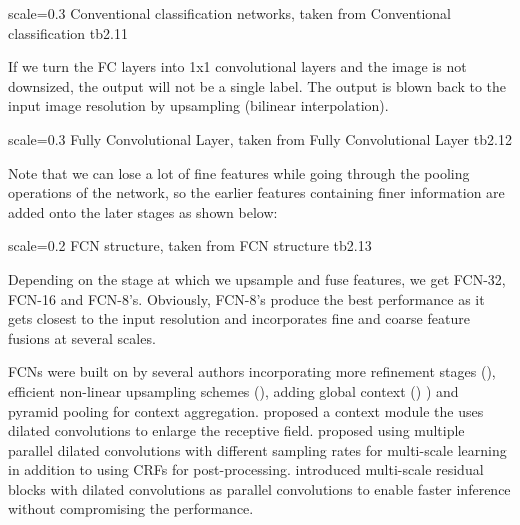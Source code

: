 {scale=0.3}%
{Conventional classification networks, taken from \cite{long2015}}%
{Conventional classification}%
{tb2.11} %

If we turn the FC layers into 1x1 convolutional layers and the image is not downsized, the output will not be a single label. The output is blown back to the input image resolution by upsampling (bilinear interpolation). 

{scale=0.3}%
{Fully Convolutional Layer, taken from \cite{long2015}}%
{Fully Convolutional Layer}%
{tb2.12}

Note that we can lose a lot of fine features while going through the pooling operations of the network, so the earlier features containing finer information are added onto the later stages as shown below:

{scale=0.2}%
{FCN structure, taken from \cite{long2015}}%
{FCN structure}%
{tb2.13}

Depending on the stage at which we upsample and fuse features, we get FCN-32, FCN-16 and FCN-8's. Obviously, FCN-8's produce the best performance as it gets closest to the input resolution and incorporates fine and coarse feature fusions at several scales. 

FCNs were built on by several authors incorporating more refinement stages (\cite{badrinarayanan2016}), efficient non-linear upsampling  schemes  (\cite{liu2015}),  adding  global  context () \cite{zhao2017})  and pyramid pooling for context aggregation. \cite{yu2016} proposed  a  context  module  the  uses  dilated  convolutions  to enlarge  the  receptive  field.  \cite{chen2017}  proposed  using multiple parallel dilated convolutions with different sampling rates  for  multi-scale  learning  in  addition  to  using  CRFs  for post-processing. \cite{Valada2017} introduced multi-scale residual blocks  with  dilated  convolutions  as  parallel  convolutions  to enable faster inference without compromising the performance.

























